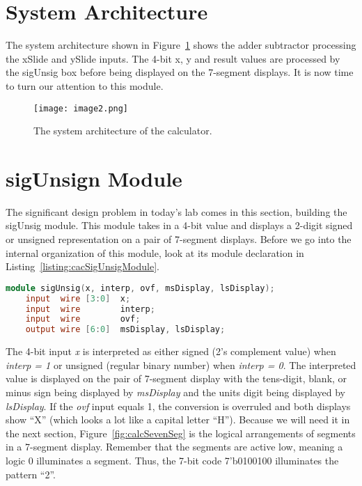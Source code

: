 \section{System Architecture}

The system architecture shown in Figure~\ref{fig:sysArchCalc} shows the adder subtractor
processing the xSlide and ySlide inputs. The 4-bit x, y and result
values are processed by the sigUnsig box before being displayed on the
7-segment displays. It is now time to turn our attention to this module.

\begin{figure}[ht]
\texttt{[image:  image2.png]}
\caption{The system architecture of the calculator.}
\label{fig:sysArchCalc}
\end{figure}

\hypertarget{sigunsign-module}{%
\section{sigUnsign Module}\label{sigunsign-module}}

The significant design problem in today's lab comes in this section,
building the sigUnsig module. This module takes in a 4-bit value and
displays a 2-digit signed or unsigned representation on a pair of
7-segment displays. Before we go into the internal organization of this
module, look at its module declaration in Listing~\ref{listing:cacSigUnsigModule}.


\begin{lstlisting}[language=Verilog,
 caption={Module declaration for the sigUnsig module.},
 label={listing:cacSigUnsigModule},
 frame=single]
 module sigUnsig(x, interp, ovf, msDisplay, lsDisplay);    
    input  wire [3:0]  x;	 	 
    input  wire        interp;
    input  wire        ovf;
    output wire [6:0]  msDisplay, lsDisplay;
 \end{lstlisting}




The 4-bit input \emph{x} is interpreted as either signed (2's complement
value) when \emph{interp = 1} or unsigned (regular binary number) when
\emph{interp = 0}. The interpreted value is displayed on the pair of
7-segment display with the tens-digit, blank, or minus sign being
displayed by \emph{msDisplay} and the units digit being displayed by
\emph{lsDisplay}. If the \emph{ovf} input equals 1, the conversion is
overruled and both displays show ``X'' (which looks a lot like a capital
letter ``H''). Because we will need it in the next section, Figure~\ref{fig:calcSevenSeg} is
the logical arrangements of segments in a 7-segment display. Remember
that the segments are active low, meaning a logic 0 illuminates a
segment. Thus, the 7-bit code 7'b0100100 illuminates the pattern ``2''.

